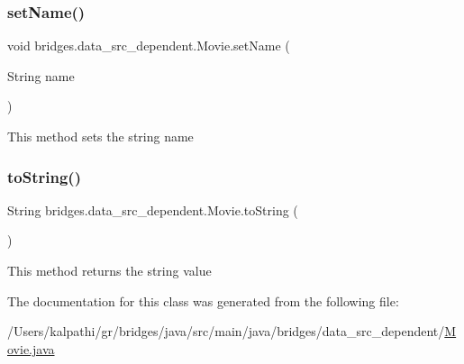\mbox{\label{classbridges_1_1data__src__dependent_1_1_movie_a1b4a3072962e5d35f035fad21b73f0f1}} 
\subsubsection{\texorpdfstring{setName()}{setName()}}
{\footnotesize\ttfamily void bridges.\+data\+\_\+src\+\_\+dependent.\+Movie.\+set\+Name (\begin{DoxyParamCaption}\item[{String}]{name }\end{DoxyParamCaption})}

This method sets the string name \mbox{\label{classbridges_1_1data__src__dependent_1_1_movie_a99d2b0845c4cbbbc141d38b5518704c6}} 
\subsubsection{\texorpdfstring{toString()}{toString()}}
{\footnotesize\ttfamily String bridges.\+data\+\_\+src\+\_\+dependent.\+Movie.\+to\+String (\begin{DoxyParamCaption}{ }\end{DoxyParamCaption})}

This method returns the string value 

The documentation for this class was generated from the following file\+:\begin{DoxyCompactItemize}
\item 
/\+Users/kalpathi/gr/bridges/java/src/main/java/bridges/data\+\_\+src\+\_\+dependent/\mbox{\hyperlink{_movie_8java}{Movie.\+java}}\end{DoxyCompactItemize}
